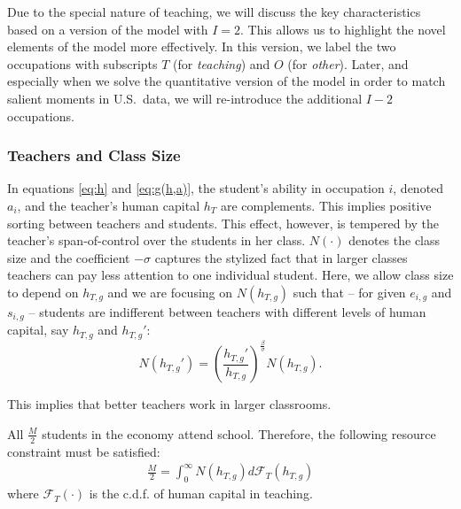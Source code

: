\documentclass[onehalfspacing,11pt]{article}
\begin{document}
	Due to the special nature of teaching, we will discuss the key characteristics based on a version of the model with $I=2$. This allows us to highlight the novel elements of the model more effectively. In this version, we label the two occupations with subscripts $T$ (for {\it teaching}) and $O$ (for {\it other}). Later, and especially when we solve the quantitative version of the model in order to match salient moments in U.S.~data, we will re-introduce the additional $I-2$ occupations.
	
	
	\subsubsection{Teachers and Class Size}
	In equations \eqref{eq:h} and \eqref{eq:g(h,a)}, the student's ability in occupation $i$, denoted $a_i$, and the teacher's human capital $h_T$ are complements. This implies positive sorting between teachers and students. This effect, however, is tempered by the teacher's span-of-control over the students in her class. $N(\cdot)$ denotes the class size and the coefficient $-\sigma$ captures the stylized fact that in larger classes teachers can pay less attention to one individual student. Here, we allow class size to depend on $h_{T,g}$ and we are focusing on $N(h_{T,g})$ such that -- for given $e_{i,g}$ and $s_{i,g}$ -- students are indifferent between teachers with different levels of human capital, say $h_{T,g}$ and ${h_{T,g}}'$:
	\begin{equation}
		\label{eq:sizedist}
		N({h_{T,g}}') = \left(\frac{{h_{T,g}}'}{{h_{T,g}}}\right)^{\frac{\beta}{\sigma}} N({h_{T,g}}).
	\end{equation}
	
	This implies that better teachers work in larger classrooms.
	
	All $\frac{M}{2}$ students in the economy attend school. Therefore, the following resource constraint must be satisfied:
	\begin{align}
		\label{resource}
		\frac{M}{2}=\int_0^\infty N(h_{T,g})d\mathcal{F}_T(h_{T,g}) 
	\end{align}
	where $\mathcal{F}_T(\cdot)$ is the c.d.f. of human capital in teaching.
	
\end{document}
